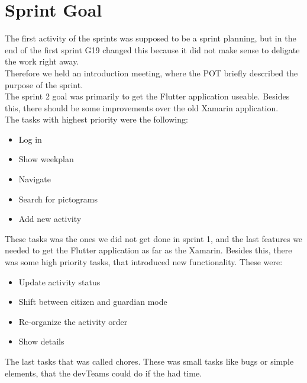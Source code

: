 \section{Sprint Goal}

The first activity of the sprints was supposed to be a sprint planning, but in the end of the first sprint \gls{G19} changed this because it did not make sense to deligate the work right away.\\
Therefore we held an introduction meeting, where the \gls{POT} briefly described the purpose of the sprint.\\
The sprint 2 goal was primarily to get the Flutter application useable. Besides this, there should be some improvements over the old Xamarin application.\\
The tasks with highest priority were the following:

\begin{itemize}
    \item Log in
    \item Show weekplan
    \item Navigate
    \item Search for pictograms
    \item Add new activity
\end{itemize}

These tasks was the ones we did not get done in sprint 1, and the last features we needed to get the Flutter application as far as the Xamarin.
Besides this, there was some high priority tasks, that introduced new functionality. These were:

\begin{itemize}
    \item Update activity status
    \item Shift between citizen and guardian mode
    \item Re-organize the activity order
    \item Show details
\end{itemize}

The last tasks that was called chores. These was small tasks like bugs or simple elements, that the \glspl{devTeam} could do if the had time. 